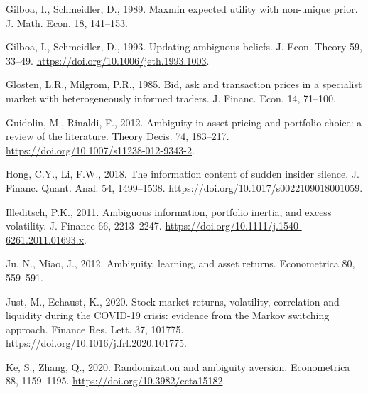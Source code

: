 \documentclass[12pt,a4paper]{article}
\newenvironment{biblock}{%
  \par\vspace{2pt}\noindent\small%
  \ignorespaces
}{%
  \par\vspace{2pt}%
}
\begin{document}
\begin{biblock}
Gilboa, I., Schmeidler, D., 1989. Maxmin expected utility with non-unique prior. J. Math. Econ. 18, 141--153.
\end{biblock}

\begin{biblock}
Gilboa, I., Schmeidler, D., 1993. Updating ambiguous beliefs. J. Econ. Theory 59, 33--49. \url{https://doi.org/10.1006/jeth.1993.1003}.
\end{biblock}

\begin{biblock}
Glosten, L.R., Milgrom, P.R., 1985. Bid, ask and transaction prices in a specialist market with heterogeneously informed traders. J. Financ. Econ. 14, 71--100.
\end{biblock}

\begin{biblock}
Guidolin, M., Rinaldi, F., 2012. Ambiguity in asset pricing and portfolio choice: a review of the literature. Theory Decis. 74, 183--217. \url{https://doi.org/10.1007/s11238-012-9343-2}.
\end{biblock}

\begin{biblock}
Hong, C.Y., Li, F.W., 2018. The information content of sudden insider silence. J. Financ. Quant. Anal. 54, 1499--1538. \url{https://doi.org/10.1017/s0022109018001059}.
\end{biblock}

\begin{biblock}
Illeditsch, P.K., 2011. Ambiguous information, portfolio inertia, and excess volatility. J. Finance 66, 2213--2247. \url{https://doi.org/10.1111/j.1540-6261.2011.01693.x}.
\end{biblock}

\begin{biblock}
Ju, N., Miao, J., 2012. Ambiguity, learning, and asset returns. Econometrica 80, 559--591.
\end{biblock}

\begin{biblock}
Just, M., Echaust, K., 2020. Stock market returns, volatility, correlation and liquidity during the COVID-19 crisis: evidence from the Markov switching approach. Finance Res. Lett. 37, 101775. \url{https://doi.org/10.1016/j.frl.2020.101775}.
\end{biblock}

\begin{biblock}
Ke, S., Zhang, Q., 2020. Randomization and ambiguity aversion. Econometrica 88, 1159--1195. \url{https://doi.org/10.3982/ecta15182}.
\end{biblock}
\end{document}
